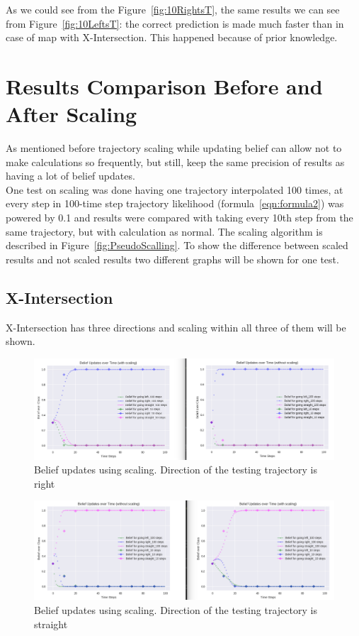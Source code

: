 As we could see from the Figure~\ref{fig:10RightsT}, the same results we can see from Figure~\ref{fig:10LeftsT}: the correct prediction is made much faster than in case of map with X-Intersection. This happened because of prior knowledge.

\section{Results Comparison Before and After Scaling}

 As mentioned before trajectory scaling while updating belief can allow not to make calculations so frequently, but still, keep the same precision of results as having a lot of belief updates. \\
 
 One test on scaling was done having one trajectory interpolated 100 times, at every step in 100-time step trajectory likelihood (formula~\ref{eqn:formula2}) was powered by 0.1 and results were compared with taking every 10th step from the same trajectory, but with calculation as normal. The scaling algorithm is described in Figure~\ref{fig:PseudoScalling}. To show the difference between scaled results and not scaled results two different graphs will be shown for one test.

\subsection{X-Intersection}

X-Intersection has three directions and scaling within all three of them will be shown.

\begin{figure}[h]
	\centering  	
	\includegraphics[width=15cm]{img/Scaling_Right_X.jpg}
	\caption{Belief updates using scaling. Direction of the testing trajectory is right}
	\label{fig:ScallingRightX}    
\end{figure}

\begin{figure}[h]
	\centering  	
	\includegraphics[width=15cm]{img/Scaling_Straight_X.jpg}
	\caption{Belief updates using scaling. Direction of the testing trajectory is straight}
	\label{fig:ScallingStraightX}    
\end{figure}

